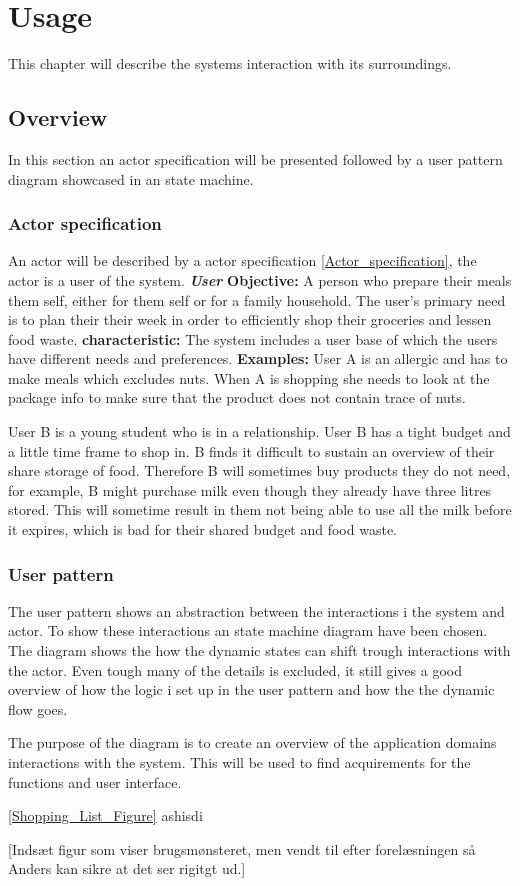 \chapter{Usage}
This chapter will describe the systems interaction with its surroundings.

\section{Overview}
In this section an actor specification will be presented followed by a user pattern diagram showcased in an state machine.

\subsection{Actor specification}
An actor will be described by a actor specification \ref{Actor_specification}, the actor is a user of the system.
\textbf{\textit{User}}\label{Actor_specification}
\textbf{Objective:} A person who prepare their meals them self, either for them self or for a family household. The user's primary need is to plan their their week in order to efficiently shop their groceries and lessen food waste.
\textbf{characteristic:} The system includes a user base of which the users have different needs and preferences.
\textbf{Examples:} User A is an allergic and has to make meals which excludes nuts. When A is shopping she needs to look at the package info to make sure that the product does not contain trace of nuts.

User B is a young student who is in a relationship. User B has a tight budget and a little time frame to shop in. B finds it difficult to sustain an overview of their share storage of food. Therefore B will sometimes buy products they do not need, for example, B might purchase milk even though they already have three litres stored. This will sometime result in them not being able to use all the milk before it expires, which is bad for their shared budget and food waste.

\subsection{User pattern}
The user pattern shows an abstraction between the interactions i the system and actor. To show these interactions an state machine diagram have been chosen. The diagram shows the how the dynamic states can shift trough interactions with the actor. Even tough many of the details is excluded, it still gives a good overview of how the logic i set up in the user pattern and how the the dynamic flow goes. 

The purpose of the diagram is to create an overview of the application domains interactions with the system. This will be used to find acquirements for the functions and user interface.


\ref{Shopping_List_Figure}  ashisdi

	
[Indsæt figur som viser brugsmønsteret, men vendt til efter forelæsningen så Anders kan sikre at det ser rigitgt ud.]